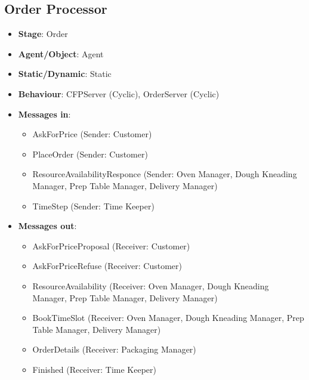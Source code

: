 \documentclass[12pt]{article}
\begin{document}
\newpage{}
\subsection{Order Processor}%
\label{sub:order_processor}
\begin{itemize}
    \item \textbf{Stage}: Order
    \item \textbf{Agent/Object}: Agent
    \item \textbf{Static/Dynamic}: Static
    \item \textbf{Behaviour}: CFPServer (Cyclic), OrderServer (Cyclic)
    \item \textbf{Messages in}:
        \begin{itemize}
            \item AskForPrice (Sender: Customer)
            \item PlaceOrder (Sender: Customer)
            \item ResourceAvailabilityResponce (Sender: Oven Manager, Dough Kneading Manager, Prep Table Manager, Delivery Manager)
            \item TimeStep (Sender: Time Keeper)
        \end{itemize}
    \item \textbf{Messages out}:
        \begin{itemize}
            \item AskForPriceProposal (Receiver: Customer)
            \item AskForPriceRefuse (Receiver: Customer)
            \item ResourceAvailability (Receiver: Oven Manager, Dough Kneading Manager, Prep Table Manager, Delivery Manager)
            \item BookTimeSlot (Receiver: Oven Manager, Dough Kneading Manager, Prep Table Manager, Delivery Manager)
            \item OrderDetails (Receiver: Packaging Manager)
            \item Finished (Receiver: Time Keeper)
        \end{itemize}
\end{itemize}

\newpage{}
\end{document}
